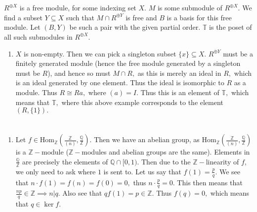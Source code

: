\documentclass{article}
\begin{document}
\section{} %
$R^{\oplus X}$ is a free module, for some indexing set $X.$ $M$ is some submodule of $R^{\oplus X}.$ We find a subset $Y \subseteq X$ such that $M \cap 
R^{\oplus Y}$ is free and $B$ is a basis for this free module. Let $(B,Y)$ be such a pair with the given partial order. $\mathbb{T}$ is the poset of all 
such submodules in $R^{\oplus X}.$
\begin{enumerate}
	\item $X$ is non-empty. Then we can pick a singleton subset $ \{x\} \subseteq X.$ $R^{\oplus Y}$ must be a finitely generated module (hence the free 
	module generated by a singleton must be $R$), and hence so must $M \cap R,$ as this is merely an ideal in $R,$ which is an ideal generated by one 
	element. Thus the ideal is isomorphic to $R$ as a module. Thus $R \cong Ra,$ where $(a)=I.$ Thus this is an element of $\mathbb{T},$ which means that 
	$\mathbb{T},$ where this above example corresponds to the element $(R,\{1\}).$ 
\end{enumerate}
\section{} %
\begin{enumerate}
	\item Let $f \in \text{Hom}_{\mathbb{Z}}\left(\frac{\mathbb{Z}}{(n)},\frac{\mathbb{Q}}{\mathbb{Z}}\right).$ Then we have an abelian group, as $ 
	\text{Hom}_{\mathbb{Z}}\left(\frac{\mathbb{Z}}{(n)},\frac{\mathbb{Q}}{\mathbb{Z}}\right)$ is a $\mathbb{Z}-$module ($\mathbb{Z}-$modules and abelian 
	groups are the same).  Elements in $\frac{\mathbb{Q}}{\mathbb{Z}}$ are precisely the elements of $\mathbb{Q} \cap [0,1).$ Then due to the 
	$\mathbb{Z}-$linearity of $f,$ we only need to ask where $1$ is sent to. Let us say that $f(1)=\frac{p}{q}.$ We see that $n \cdot f(1)=f(n)=f(0)=0,$ 
	thus $n \cdot \frac{p}{q}=0.$ This then means that $\frac{np}{q} \in \mathbb{Z} \implies n | q.$ Also see that $qf(1)=p \in \mathbb{Z}.$ Thus $f(q)=0,$ 
	which means that $q \in \ker f.$  
\end{enumerate}
\end{document}
